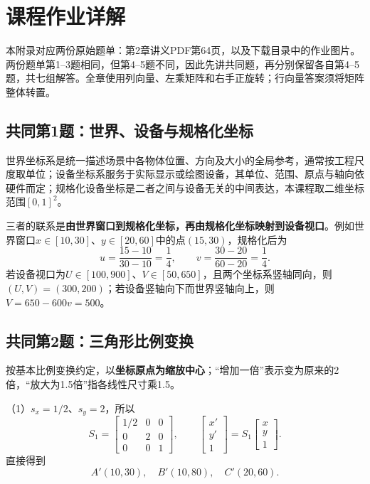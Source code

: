 \chapter{课程作业详解}
\label{app:homework}

本附录对应两份原始题单：第2章讲义PDF第64页，以及下载目录中的作业图片。两份题单第1--3题相同，但第4--5题不同，因此先讲共同题，再分别保留各自第4--5题，共七组解答。全章使用列向量、左乘矩阵和右手正旋转；行向量答案须将矩阵整体转置。

\section{共同第1题：世界、设备与规格化坐标}
\sol 世界坐标系是统一描述场景中各物体位置、方向及大小的全局参考，通常按工程尺度取单位；设备坐标系服务于实际显示或绘图设备，其单位、范围、原点与轴向依硬件而定；规格化设备坐标是二者之间与设备无关的中间表达，本课程取二维坐标范围$[0,1]^2$。

三者的联系是\textbf{由世界窗口到规格化坐标，再由规格化坐标映射到设备视口}。例如世界窗口$x\in[10,30]$、$y\in[20,60]$中的点$(15,30)$，规格化后为
\[
u=\frac{15-10}{30-10}=\frac14,\qquad
v=\frac{30-20}{60-20}=\frac14.
\]
若设备视口为$U\in[100,900]$、$V\in[50,650]$，且两个坐标系竖轴同向，则$(U,V)=(300,200)$；若设备竖轴向下而世界竖轴向上，则$V=650-600v=500$。

\section{共同第2题：三角形比例变换}
\sol 按基本比例变换约定，以\textbf{坐标原点为缩放中心}；“增加一倍”表示变为原来的2倍，“放大为1.5倍”指各线性尺寸乘1.5。

（1）$s_x=1/2$、$s_y=2$，所以
\[
S_1=\begin{bmatrix}1/2&0&0\\0&2&0\\0&0&1\end{bmatrix},\qquad
\begin{bmatrix}x'\\y'\\1\end{bmatrix}=S_1\begin{bmatrix}x\\y\\1\end{bmatrix}.
\]
直接得到
\[
\boxed{A'(10,30),\quad B'(10,80),\quad C'(20,60).}
\]


